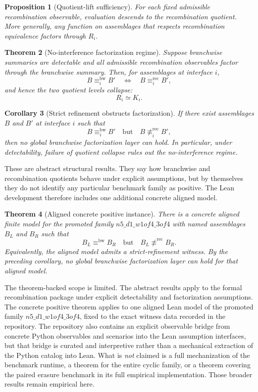 \documentclass[11pt]{article}
\newtheorem{theorem}{Theorem}[section]
\newtheorem{proposition}[theorem]{Proposition}
\newtheorem{corollary}[theorem]{Corollary}
\theoremstyle{definition}
\begin{document}
\begin{proposition}[Quotient-lift sufficiency]
For each fixed admissible recombination observable, evaluation descends to the recombination quotient. More generally, any function on assemblages that respects recombination equivalence factors through \(R_i\).
\end{proposition}

\begin{theorem}[No-interference factorization regime]
Suppose branchwise summaries are detectable and all admissible recombination observables factor through the branchwise summary. Then, for assemblages at interface \(i\),
\[
B \equiv_i^{\mathrm{bw}} B'
\quad\Longleftrightarrow\quad
B \equiv_i^{\mathrm{rec}} B',
\]
and hence the two quotient levels collapse:
\[
R_i \simeq K_i.
\]
\end{theorem}

\begin{corollary}[Strict refinement obstructs factorization]
If there exist assemblages \(B\) and \(B'\) at interface \(i\) such that
\[
B \equiv_i^{\mathrm{bw}} B'
\quad\text{but}\quad
B \not\equiv_i^{\mathrm{rec}} B',
\]
then no global branchwise factorization layer can hold. In particular, under detectability, failure of quotient collapse rules out the no-interference regime.
\end{corollary}

These are abstract structural results. They say how branchwise and recombination quotients behave under explicit assumptions, but by themselves they do not identify any particular benchmark family as positive. The Lean development therefore includes one additional concrete aligned model.

\begin{theorem}[Aligned concrete positive instance]
There is a concrete aligned finite model for the promoted family \(n5\_d1\_w1of4\_3of4\) with named assemblages \(B_L\) and \(B_R\) such that
\[
B_L \equiv^{\mathrm{bw}} B_R
\quad\text{but}\quad
B_L \not\equiv^{\mathrm{rec}} B_R.
\]
Equivalently, the aligned model admits a strict-refinement witness. By the preceding corollary, no global branchwise factorization layer can hold for that aligned model.
\end{theorem}

The theorem-backed scope is limited. The abstract results apply to the formal recombination package under explicit detectability and factorization assumptions. The concrete positive theorem applies to one aligned Lean model of the promoted family \(n5\_d1\_w1of4\_3of4\), fixed to the exact witness data recorded in the repository. The repository also contains an explicit observable bridge from concrete Python observables and scenarios into the Lean assumption interfaces, but that bridge is curated and interpretive rather than a mechanical extraction of the Python catalog into Lean. What is \emph{not} claimed is a full mechanization of the benchmark runtime, a theorem for the entire cyclic family, or a theorem covering the paired erasure benchmark in its full empirical implementation. Those broader results remain empirical here.
\end{document}
